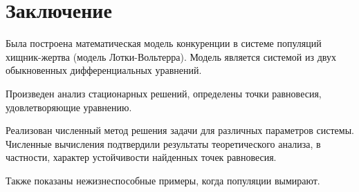 \chapter{Заключение}
Была построена математическая модель конкуренции в системе популяций хищник-жертва (модель Лотки-Вольтерра).
Модель является системой из двух обыкновенных дифференциальных уравнений.

Произведен анализ стационарных решений, определены точки равновесия, удовлетворяющие уравнению.

Реализован численный метод решения задачи для различных параметров системы. Численные вычисления подтвердили результаты теоретического анализа, в частности, характер устойчивости найденных точек равновесия.

Также показаны нежизнеспособные примеры, когда популяции вымирают.